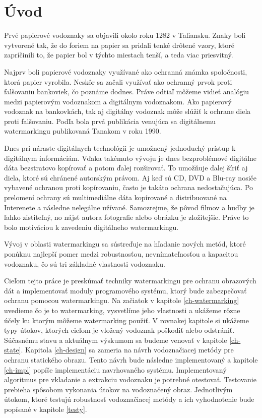 \chapter{Úvod}
Prvé papierové vodoznaky sa objavili okolo roku 1282 v Taliansku. Znaky boli vytvorené tak, že do foriem na papier sa pridali tenké drôtené vzory, ktoré zapríčinili to, že papier bol v týchto miestach tenší, a teda viac priesvitný. \cite{Cox}

Najprv boli papierové vodoznaky využívané ako ochranná známka spoločnosti, ktorá papier vyrobila. Neskôr sa začali využívať ako ochranný prvok proti falšovaniu bankoviek, čo poznáme dodnes. Práve odtiaľ môžeme vidieť analógiu medzi papierovým vodoznakom a digitálnym vodoznakom. Ako papierový vodoznak na bankovkách, tak aj digitálny vodoznak môže slúžiť k ochrane diela proti falšovaniu. Podľa \cite{Katzenbeisser} bola prvá publikácia venujúca sa digitálnemu watermarkingu publikovaná Tanakom v roku 1990.

Dnes pri náraste digitálnych technológii je umožnený jednoduchý prístup k digitálnym informáciám. Vďaka takémuto vývoju je dnes bezproblémové digitálne dáta bezstratovo kopírovať a potom ďalej rozširovať. To umožňuje ďalej šíriť aj diela, ktoré sú chránené autorským právom. Aj keď sú CD, DVD a Blu-ray nosiče vybavené ochranou proti kopírovaniu, často je takáto ochrana nedostačujúca. Po prelomení ochrany sú multimediálne dáta kopírované a distribuované na Interenete a následne nelegálne užívané. Samozrejme, že pôvod filmov a hudby je ľahko zistiteľný, no nájsť autora fotografie alebo obrázku je zložitejšie. Práve to bolo motiváciou k zavedeniu digitálneho watermarkingu.

Vývoj v oblasti watermarkingu sa sústreďuje na hľadanie nových metód, ktoré ponúknu najlepší pomer medzi robustnosťou, nevnímateľnosťou a kapacitou vodoznaku, čo sú tri základné vlastnosti vodoznaku.

Cieľom tejto práce je preskúmať techniky watermarkingu pre ochranu obrazových dát a implementovať moduly programového systému, ktorý bude zabezpečovať ochranu pomocou watermarkingu. Na začiatok v kapitole \ref{ch-watermarking} uvedieme čo je to watermarking, vysvetlíme jeho vlastnosti a ukážeme rôzne účely ku ktorým môžeme watermarking použiť. V rovnakej kapitole si ukážeme typy útokov, ktorých cieľom je vložený vodoznak poškodiť alebo odstrániť. Súčasnému stavu a aktuálnym výskumom sa budeme venovať v kapitole \ref{ch-state}. Kapitola \ref{ch-design} sa zameria na návrh vodoznačiacej metódy pre ochranu statického obrazu. Tento návrh bude následne implementovaný a kapitole \ref{ch-impl} popíše implementáciu navrhovaného systému. Implementovaný algoritmus pre vkladanie a extrakciu vodoznaku je potrebné otestovať. Testovanie prebieha spôsobom vykonania útokov na vodoznačený obraz. Jednotlivým útokom, ktoré testujú robustnosť vodoznačiacej metódy a ich vyhodnotenie bude popísané v kapitole \ref{testy}.

